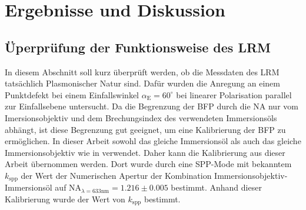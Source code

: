 \documentclass{article}
\begin{document}
\section{Ergebnisse und Diskussion}
	\subsection{Üperprüfung der Funktionsweise des LRM}
		In diesem Abschnitt soll kurz überprüft werden, ob die Messdaten des LRM tatsächlich Plasmonischer Natur sind. Dafür wurden die Anregung an einem Punktdefekt bei einem Einfallswinkel $\alpha_{\mathrm{E}} = 60^\circ$ bei linearer Polarisation parallel zur Einfallsebene untersucht. Da die Begrenzung der BFP durch die NA nur vom Imersionsobjektiv und dem Brechungsindex des verwendeten Immersionsöls abhängt, ist diese Begrenzung gut geeignet, um eine Kalibrierung der BFP zu ermöglichen. In dieser Arbeit sowohl das gleiche Immersionsöl als auch das gleiche Immersionsobjektiv wie in\cite{Jaruschewski.2020} verwendet. Daher kann die Kalibrierung aus dieser Arbeit übernommen werden. Dort wurde durch eine SPP-Mode mit bekanntem $k_{\mathrm{spp}}$ der Wert der Numerischen Apertur der Kombination Immersionsobjektiv-Immersionsöl auf $\mathrm{NA}_{\lambda = 633 \mathrm{nm}} = 1.216 \pm 0.005$  bestimmt. Anhand dieser Kalibrierung wurde der Wert von $k_{\mathrm{spp}}$ bestimmt.
	
\end{document}
